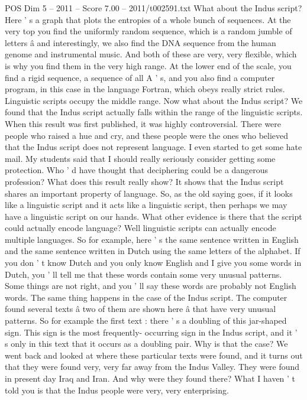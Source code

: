 \begin{textsample}{POS Dim 5 – 2011 – Score 7.00 – 2011/t002591.txt}
What about the Indus script?
Here ' s a graph that plots the entropies of a whole bunch of sequences.
At the very top you find the uniformly random sequence, which is a random jumble of letters â and interestingly, we also find the DNA sequence from the human genome and instrumental music.
And both of these are very, very flexible, which is why you find them in the very high range.
At the lower end of the scale, you find a rigid sequence, a sequence of all A ' s, and you also find a computer program, in this case in the language Fortran, which obeys really strict rules.
Linguistic scripts occupy the middle range.
Now what about the Indus script?
We found that the Indus script actually falls within the range of the linguistic scripts.
When this result was first published, it was highly controversial.
There were people who raised a hue and cry, and these people were the ones who believed that the Indus script does not represent language.
I even started to get some hate mail.
My students said that I should really seriously consider getting some protection.
Who ' d have thought that deciphering could be a dangerous profession?
What does this result really show?
It shows that the Indus script shares an important property of language.
So, as the old saying goes, if it looks like a linguistic script and it acts like a linguistic script, then perhaps we may have a linguistic script on our hands.
What other evidence is there that the script could actually encode language?
Well linguistic scripts can actually encode multiple languages.
So for example, here ' s the same sentence written in English and the same sentence written in Dutch using the same letters of the alphabet.
If you don ' t know Dutch and you only know English and I give you some words in Dutch, you ' ll tell me that these words contain some very unusual patterns.
Some things are not right, and you ' ll say these words are probably not English words.
The same thing happens in the case of the Indus script.
The computer found several texts â two of them are shown here â that have very unusual patterns.
So for example the first text : there ' s a doubling of this jar-shaped sign.
This sign is the most frequently- occurring sign in the Indus script, and it ' s only in this text that it occurs as a doubling pair.
Why is that the case?
We went back and looked at where these particular texts were found, and it turns out that they were found very, very far away from the Indus Valley.
They were found in present day Iraq and Iran.
And why were they found there?
What I haven ' t told you is that the Indus people were very, very enterprising.

\end{textsample}
